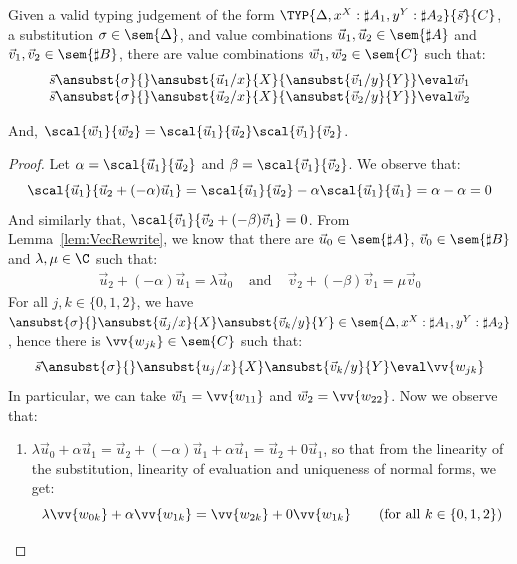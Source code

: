 \begin{lemma}\label{lem:UnitPreserTens} %
Given a valid typing judgement of the form $\TYP{\Delta,x^{X}:\sharp A_1, y^{Y}:\sharp A_2}{\vec{s}}{C}$, a substitution $\sigma\in\sem{\Delta}$, and value combinations $\vec{u}_{1},\vec{u}_{2}\in\sem{\sharp A}$ and $\vec{v}_{1},\vec{v}_{2}\in\sem{\sharp B}$, there are value combinations $\vec{w}_{1},\vec{w}_{2}\in\sem{C}$ such that:
\[
\begin{array}{c}
    \vec{s}\ansubst{\sigma}{}\ansubst{\vec{u}_{1}/x}{X}{\ansubst{\vec{v}_{1}/y}{Y}}\eval\vec{w}_{1}\\
    \vec{s}\ansubst{\sigma}{}\ansubst{\vec{u}_{2}/x}{X}{\ansubst{\vec{v}_{2}/y}{Y}}\eval\vec{w}_{2}\\
\end{array}
\]

And, $\scal{\vec{w}_{1}}{\vec{w}_{2}} = \scal{\vec{u}_{1}}{\vec{u}_{2}} \scal{\vec{v}_{1}}{\vec{v}_{2}}$.

\begin{proof}
    Let $\alpha=\scal{\vec{u}_{1}}{\vec{u}_{2}}$ and $\beta=\scal{\vec{v}_{1}}{\vec{v}_{2}}$. We observe that:
    \[
    \scal{\vec{u}_{1}}{\vec{u}_{2}+(-\alpha)\vec{u}_{1}} = \scal{\vec{u}_{1}}{\vec{u}_{2}} - \alpha \scal{\vec{u}_{1}}{\vec{u}_{1}} = \alpha - \alpha = 0
    \]
    And similarly that, $\scal{\vec{v}_{1}}{\vec{v}_{2}+ (-\beta) \vec{v}_{1}} = 0$. From Lemma~\ref{lem:VecRewrite}, we know that there are $\vec{u}_{0}\in\sem{\sharp A}$, $\vec{v}_{0}\in\sem{\sharp B}$ and $\lambda,\mu\in\C$ such that:
    \begin{align*}
        \vec{u}_{2} +(-\alpha)\vec{u}_{1} = \lambda\vec{u}_{0}& \text{ and } & \vec{v}_{2} + (-\beta)\vec{v}_{1} = \mu\vec{v}_{0} 
    \end{align*}
    For all $j,k\in\{0,1,2\}$, we have$\ansubst{\sigma}{}\ansubst{\vec{u}_{j}/x}{X}\ansubst{\vec{v}_{k}/y}{Y}\in\sem{\Delta,x^{X}:\sharp A_1, y^{Y}:\sharp A_2}$, hence there is $\vv{w_{jk}}\in\sem{C}$ such that:
    \[
    \vec{s}\ansubst{\sigma}{}\ansubst{u_j/x}{X}\ansubst{\vec{v}_{k}/y}{Y}\eval\vv{w_{jk}}
    \]
    In particular, we can take $\vec{w}_{1}=\vv{w_{11}}$ and $\vec{w}_{2}=\vv{w_{22}}$. Now we observe that:
    \begin{enumerate}
        \item\label{A9:it1} $\lambda \vec{u}_{0} + \alpha\vec{u}_{1}=\vec{u}_{2} + (-\alpha) \vec{u}_{1} + \alpha \vec{u}_{1} = \vec{u}_{2} + 0 \vec{u}_{1}$, so that from the linearity of the substitution, linearity of evaluation and uniqueness of normal forms, we get:
        \[
        \lambda\vv{w_{0k}} + \alpha \vv{w_{1k}} = \vv{w_{2k}} + 0 \vv{w_{1k}} \qquad(\text{for all }k\in\{0,1,2\})
        \]
        

\end{enumerate}
\end{proof}
\end{lemma}
